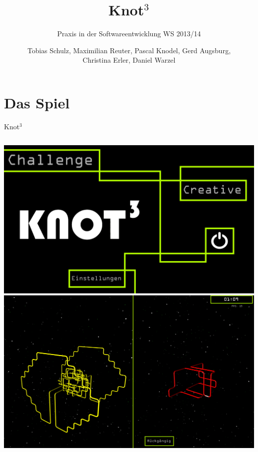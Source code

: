 \documentclass[18pt]{beamer}
\title[]{\huge{Knot$^3$} }
\subtitle{Praxis in der Softwareentwicklung WS 2013/14}
\author{Tobias Schulz, Maximilian Reuter, Pascal Knodel, Gerd Augsburg,\\ Christina Erler, Daniel Warzel}
\institute{Institut für Betriebs- und Dialogsysteme, Lehrstuhl für Computergrafik}
\begin{document}

\begin{frame}
\titlepage
\end{frame}


\section{Das Spiel}
\begin{frame}{Knot$^3$}

\begin{columns}[c]
	\includegraphics[scale=0.18]{menu}
 	\includegraphics[scale=0.18]{challange}
\end{columns}

\end{frame}
\end{document}

